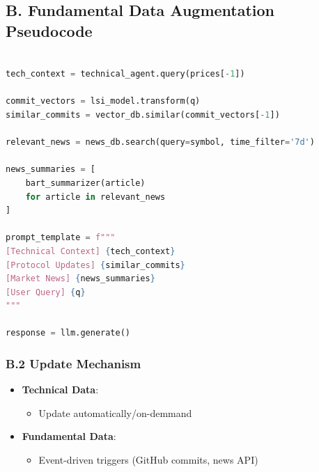 \documentclass[12pt]{article}
\begin{document}
\subsection*{B. Fundamental Data Augmentation Pseudocode}
\begin{lstlisting}[language=Python, caption={Fundamental Data Augmentation Pipeline}]

tech_context = technical_agent.query(prices[-1])
    
commit_vectors = lsi_model.transform(q)
similar_commits = vector_db.similar(commit_vectors[-1])
    
relevant_news = news_db.search(query=symbol, time_filter='7d')

news_summaries = [
    bart_summarizer(article) 
    for article in relevant_news
]
    
prompt_template = f"""
[Technical Context] {tech_context}
[Protocol Updates] {similar_commits}
[Market News] {news_summaries}
[User Query] {q}
"""
    
response = llm.generate()
\end{lstlisting}

\subsubsection*{B.2 Update Mechanism}
\begin{itemize}
\item \textbf{Technical Data}:
\begin{itemize}
\item Update automatically/on-demmand
\end{itemize}

\item \textbf{Fundamental Data}:
\begin{itemize}
\item Event-driven triggers (GitHub commits, news API)
\end{itemize}
\end{itemize}
\end{document}
